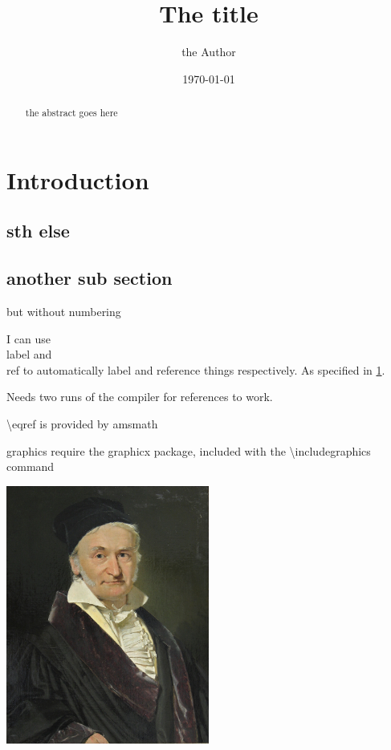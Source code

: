\documentclass{article}
\title{The title}
\author{the Author}
\date{\today}
\begin{document}
\maketitle
\tableofcontents

\begin{abstract}
\label{sec:abstract}
    the abstract goes here
\end{abstract}

\section{Introduction}
\label{sec:intro}


\subsection{sth else}

\subsection*{another sub section}
but without numbering

I can use \\label and \\ref to automatically label and reference things
respectively. As specified in \ref{sec:intro}.

Needs two runs of the compiler for references  to work.

\textbackslash eqref is provided by amsmath

graphics require the graphicx package, included with the \textbackslash includegraphics command

\includegraphics[width=0.5\textwidth]{gauss.jpeg}
\end{document}

